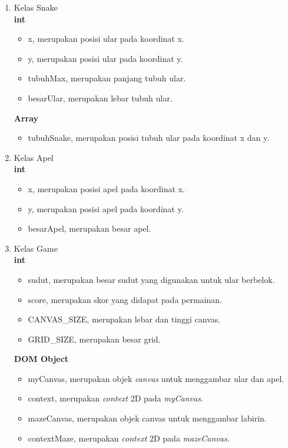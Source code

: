 \begin{enumerate}
	\item Kelas Snake\\
\textbf{int}

\begin{itemize}
	\item x, merupakan posisi ular pada koordinat x.
	\item y, merupakan posisi ular pada koordinat y.
	\item tubuhMax, merupakan panjang tubuh ular.
	\item besarUlar, merupakan lebar tubuh ular.
\end{itemize}

\textbf{Array}

\begin{itemize}
	\item tubuhSnake, merupakan posisi tubuh ular pada koordinat x dan y.
\end{itemize}

	\item Kelas Apel\\
	\textbf{int}
	
\begin{itemize}
	\item x, merupakan posisi apel pada koordinat x.
	\item y, merupakan posisi apel pada koordinat y.
	\item besarApel, merupakan besar apel.
\end{itemize}

\item Kelas Game \\
\textbf{int}

\begin{itemize}
	\item sudut, merupakan besar sudut yang digunakan untuk ular berbelok.
	\item score, merupakan skor yang didapat pada permainan.
	\item CANVAS\_SIZE, merupakan lebar dan tinggi canvas.
	\item GRID\_SIZE, merupakan besar grid.
\end{itemize}

\textbf{DOM Object}

\begin{itemize}
	\item myCanvas, merupakan objek \textit{canvas} untuk menggambar ular dan apel.
	\item context, merupakan \textit{context} 2D pada \textit{myCanvas}. 
	\item mazeCanvas, merupakan objek canvas untuk menggambar labirin.
	\item contextMaze, merupakan \textit{context} 2D  pada \textit{mazeCanvas}.
\end{itemize}


\end{enumerate}
